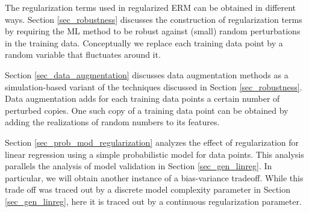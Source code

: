 \documentclass[12pt]{report}
\begin{document}

The regularization terms used in regularized ERM can be obtained in different ways. 
Section \ref{sec_robustness} discusses the construction of regularization terms 
by requiring the ML method to be robust against (small) random perturbations in 
the training data. Conceptually we replace each training data point by a random 
variable that fluctuates around it. 

Section \ref{sec_data_augmentation} discusses data augmentation methods as 
a simulation-based variant of the techniques discussed in Section \ref{sec_robustness}. 
Data augmentation adds for each training data points a certain number of perturbed 
copies. One such copy of a training data point can be obtained by adding the 
realizations of random numbers to its features. 

Section \ref{sec_prob_mod_regularization} analyzes the effect of regularization 
for linear regression using a simple probabilistic model for data points. This 
analysis parallels the analysis of model validation in Section \ref{sec_gen_linreg}. 
In particular, we will obtain another instance of a bias-variance tradeoff. While 
this trade off was traced out by a discrete model complexity parameter 
in Section \ref{sec_gen_linreg}, here it is traced out by a continuous 
regularization parameter. 
\end{document}
